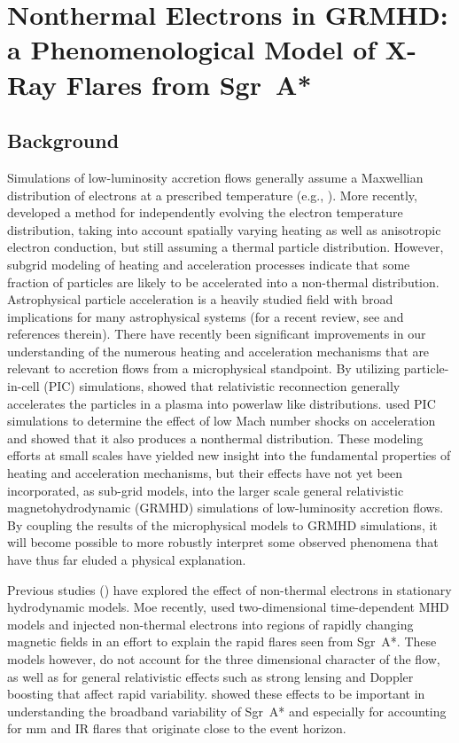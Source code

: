 \chapter[chapter2]
{Nonthermal Electrons in GRMHD: a Phenomenological Model of X-Ray Flares from Sgr~A*}

\section{Background}
Simulations of low-luminosity accretion flows generally assume a Maxwellian distribution of electrons at a prescribed temperature (e.g., \citealt{dexter2012, drappeau2013, moscibrodzka2014, chan2015b}).  More recently, \citet{ressler2015} developed a method for independently evolving the electron temperature distribution, taking into account spatially varying heating as well as anisotropic electron conduction, but still assuming a thermal particle distribution.  However, subgrid
modeling of heating and acceleration processes indicate that some fraction of particles are likely to be accelerated
into a non-thermal distribution.  Astrophysical particle acceleration is a heavily studied field with broad implications for many astrophysical systems (for a recent review, see \citealt{Lazarian2012} and references therein). There have recently been significant improvements in our understanding of the numerous heating and acceleration mechanisms that are relevant to accretion flows from a microphysical standpoint.  By utilizing particle-in-cell (PIC) simulations, \citet{sironi2014} showed that relativistic reconnection generally accelerates the particles in a plasma into powerlaw like distributions. \citet{guo2014} used PIC simulations to determine the effect of low Mach number shocks
on acceleration and showed that it also produces a nonthermal distribution. These modeling efforts at small
scales have yielded new insight into the fundamental properties of heating and acceleration mechanisms, but
their effects have not yet been incorporated, as sub-grid models, into the larger scale general relativistic magnetohydrodynamic (GRMHD) simulations of low-luminosity accretion flows. By coupling the results of the microphysical models to GRMHD simulations, it will become possible to more robustly interpret some observed phenomena that have thus far eluded a physical explanation.

Previous studies () have explored the effect of non-thermal electrons in stationary hydrodynamic models.  Moe recently, \citet{dodds-eden2010} used two-dimensional time-dependent MHD models and injected non-thermal electrons into regions of rapidly changing magnetic fields in an effort to explain the rapid flares seen from Sgr~A*.  These models however, do not account for the three dimensional character of the flow, as well as for general relativistic effects such as strong lensing and Doppler boosting that affect rapid variability.  \citet{chan2015a} showed these effects to be important in understanding the broadband variability of Sgr~A* and especially for accounting for mm and IR flares that originate close to the event horizon.

